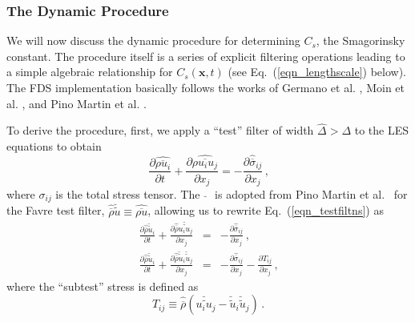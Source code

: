 \subsubsection{The Dynamic Procedure}

We will now discuss the dynamic procedure for determining $C_s$, the Smagorinsky constant.  The procedure itself is a series of explicit filtering operations leading to a simple algebraic relationship for $C_s(\mathbf{x},t)$ (see Eq.~(\ref{eqn_lengthscale}) below).  The FDS implementation basically follows the works of Germano et al. \cite{Germano:1991}, Moin et al. \cite{Moin:1991}, and Pino Martin et al. \cite{PinoMartin:2000}.

To derive the procedure, first, we apply a ``test'' filter of width $\hat{\Delta}>\Delta$ to the LES equations to obtain
\begin{equation}
\label{eqn_testfiltns}
\frac{\partial \widehat{\overline{\rho u_i}}}{\partial t} + \frac{\partial \widehat{\overline{\rho u_i u_j}}}{\partial x_j} = -\frac{\partial \widehat{\overline{\sigma}}_{ij}}{\partial x_j} \,\mbox{,}
\end{equation}
where $\sigma_{ij}$ is the total stress tensor. The $\,\,\breve{}\,\,$ is adopted from Pino Martin et al.~\cite{PinoMartin:2000} for the Favre test filter, $\widehat{\overline{\rho}} \breve{ \widetilde{u} } \equiv \widehat{ \overline{ \rho u }}$, allowing us to rewrite Eq.~(\ref{eqn_testfiltns}) as
\begin{eqnarray}
\label{eqn_testfavrefiltns}
\frac{\partial \widehat{\overline{\rho}} \breve{\widetilde{u}}_i}{\partial t} + \frac{\partial \widehat{\overline{\rho}} \breve{\widetilde{u_i u_j}}}{\partial x_j} &=& -\frac{\partial \widehat{\overline{\sigma}}_{ij}}{\partial x_j} \,\mbox{,} \nonumber\\
\frac{\partial \widehat{\overline{\rho}} \breve{\widetilde{u}}_i}{\partial t} + \frac{\partial \widehat{\overline{\rho}} \breve{\widetilde{u}}_i \breve{\widetilde{u}}_j}{\partial x_j} &=& -\frac{\partial \widehat{\overline{\sigma}}_{ij}}{\partial x_j} - \frac{\partial T_{ij}}{\partial x_j}\,\mbox{,}
\end{eqnarray}
where the ``subtest'' stress is defined as
\begin{equation}
\label{eqn_subteststress}
T_{ij} \equiv \widehat{\overline{\rho}} \left( \breve{\widetilde{u_i u_j}} - \breve{\widetilde{u}}_i \breve{\widetilde{u}}_j \right) \,\mbox{.}
\end{equation}

